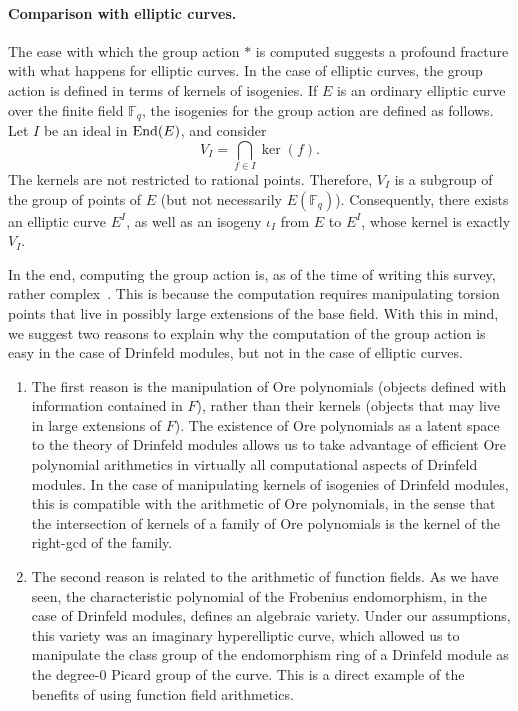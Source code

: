 \documentclass[11pt]{article}
\theoremstyle{definition}
\newcommand\Fq{\mathbb{F}_q}
\newcommand\End{\text{\rm End}}
\begin{document}
\paragraph{Comparison with elliptic curves.}
The ease with which the group action $\ast$ is computed suggests a profound
fracture with what happens for elliptic curves. In the case of elliptic curves,
the group action is defined in terms of kernels of isogenies. If $E$ is an ordinary elliptic
curve over the finite field $\Fq$, the isogenies for the group action are
defined as follows. Let $I$ be an ideal in $\End(E)$, and  consider
\[
  V_I = \bigcap_{f \in I}\ker(f).
\]
The kernels are not restricted to rational points. Therefore, $V_I$ is a
subgroup of the group of points of $E$ (but not necessarily $E(\Fq)$). Consequently, there
exists an elliptic curve $E^I$, as well as an isogeny $\iota_I$ from $E$ to $E^I$,
whose kernel is exactly $V_I$.

In the end, computing the group action is, as of the time of writing this
survey, rather complex~\cite{de_feo_towards_2018}. This is because the computation requires manipulating torsion points that live in possibly
large extensions of the base field. With this in mind, we suggest two reasons to explain why the computation of the group action is easy in the case
of Drinfeld modules, but not in the case of elliptic curves.

\begin{enumerate}

  \item The first reason is the manipulation of Ore polynomials (objects
    defined with information contained in $F$), rather than their kernels
    (objects that may live in large extensions of $F$). The existence of Ore
    polynomials as a latent space to the theory of Drinfeld modules allows us to take advantage of efficient Ore polynomial arithmetics in virtually all
    computational aspects of Drinfeld modules. In the case of manipulating
    kernels of isogenies of Drinfeld modules, this is compatible with the
    arithmetic of Ore polynomials, in the sense that the intersection of
    kernels of a family of Ore polynomials is the kernel of the right-gcd of
    the family.

  \item The second reason is related to the arithmetic of function fields. As
    we have seen, the characteristic polynomial of the Frobenius endomorphism,
    in the case of Drinfeld modules, defines an algebraic variety. Under our
    assumptions, this variety was an imaginary hyperelliptic curve, which
    allowed us to manipulate the class group of the endomorphism ring of a
    Drinfeld module as the degree-$0$ Picard group of the curve. This is a
    direct example of the benefits of using function field arithmetics.

\end{enumerate}
\end{document}
